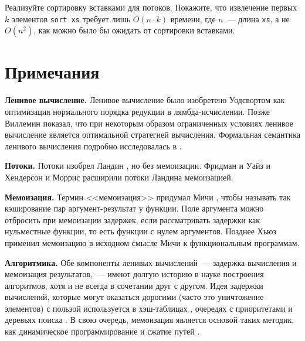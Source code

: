 \begin{exercise}\label{ex:4.2}
  Реализуйте сортировку вставками для потоков. Покажите, что
  извлечение первых $k$ элементов \lstinline!sort xs! требует лишь
  $O (n \cdot k)$ времени, где $n$~--- длина \lstinline!xs!, а не
  $O(n^2)$, как можно было бы ожидать от сортировки вставками.
\end{exercise}

\section{Примечания}
\label{sc:4.3}

\textbf{Ленивое вычисление.} Ленивое вычисление было изобретено
Уодсвортом \cite{Wadsworth1971} как оптимизация нормального порядка
редукции в лямбда-исчислении. Позже Виллемин \cite{Vuillemin1974}
показал, что при некоторым образом ограниченных условиях ленивое
вычисление является оптимальной стратегией вычисления. Формальная
семантика ленивого вычисления подробно исследовалась в
\cite{Josephs1989, Launchbury1993, OkasakiLeeTarditi1994, Ariola-etal1995}.

\noindent
\textbf{Потоки.} Потоки изобрел Ландин \cite{Landin1965}, но без
мемоизации. Фридман и Уайз \cite{FriedmanWise1976} и Хендерсон и
Моррис \cite{HendersonMorris1976} расширили потоки Ландина
мемоизацией.

\noindent
\textbf{Мемоизация.} Термин <<мемоизация>> придумал Мичи
\cite{Michie1968}, чтобы называть так кэширование пар
аргумент-результат у функции. Поле аргумента можно отбросить при мемоизации
задержек, если рассматривать задержки как нульместные функции, то
есть функции с нулем аргументов. Позднее Хьюз \cite{Hughes1985}
применил мемоизацию в исходном смысле Мичи к функциональным
программам.

\noindent
\textbf{Алгоритмика.} Обе компоненты ленивых вычислений~--- задержка
вычисления и мемоизация результатов,~--- имеют долгую историю в науке
построения алгоритмов, хотя и не всегда в сочетании друг с
другом. Идея задержки вычислений, которые могут оказаться дорогими
(часто это уничтожение элементов) с пользой используется в
хэш-таблицах \cite{vanWykVitter1986}, очередях с приоритетами
\cite{SleatorTarjan1986b, FredmanTarjan1987} и деревьях поиска
\cite{Driscoll-etal1989}. В свою очередь, мемоизация является основой
таких методик, как динамическое программирование \cite{Bellman1957} и
сжатие путей \cite{HopcroftUllman1973, TarjanvanLeeuwen1984}.

